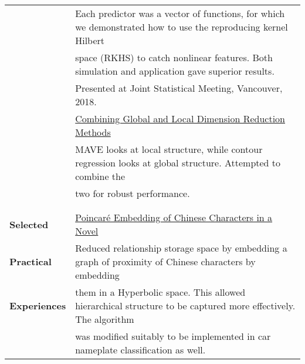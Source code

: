 \documentclass[utf8,letterpaper,oneside]{article}
\begin{document}
\begin{center}
\begin{tabular}{l l}
                           & Each predictor was a vector of functions, for which we demonstrated how to use the reproducing kernel Hilbert                                    \\
                           & space (RKHS) to catch nonlinear features. Both simulation and application gave superior results.                                                 \\
                           & Presented at Joint Statistical Meeting, Vancouver, 2018.                                                                                         \\
                           & \underline{Combining Global and Local Dimension Reduction Methods}                                                                               \\
                           & MAVE looks at local structure, while contour regression looks at global structure. Attempted to combine the                                      \\
                           & two for robust performance.                                                                                                                      \\
                           &                                                                                                                                                  \\ \hline
                           &                                                                                                                                                  \\
  \textbf{Selected}        & \underline{Poincar\'e Embedding of Chinese Characters in a Novel}                                                                                \\
  \textbf{Practical}       & Reduced relationship storage space by embedding a graph of proximity of Chinese characters by embedding                                          \\
  \textbf{Experiences}     & them in a Hyperbolic space. This allowed hierarchical structure to be captured more effectively. The algorithm                                   \\
                           & was modified suitably to be implemented in car nameplate classification as well.                                                                 \\

\end{tabular}
\end{center}
\end{document}
